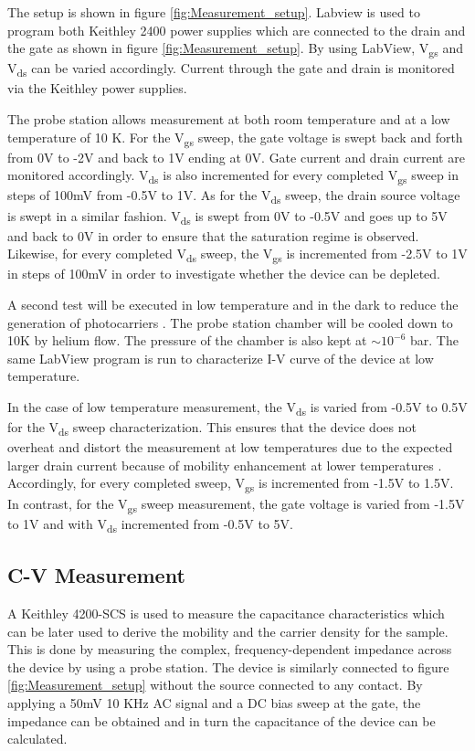\documentclass[11pt,a4paper]{report}
\begin{document}
The setup is shown in figure \ref{fig:Measurement_setup}. Labview is used to program both Keithley 2400 power supplies which are connected to the drain and the gate as shown in figure \ref{fig:Measurement_setup}. By using LabView, V\textsubscript{gs} and V\textsubscript{ds} can be varied accordingly. Current through the gate and drain is monitored via the Keithley power supplies.

The probe station allows measurement at both room temperature and at a low temperature of 10 K. For the V\textsubscript{gs} sweep, the gate voltage is swept back and forth from 0V to -2V and back to 1V ending at 0V. Gate current and drain current are monitored accordingly. V\textsubscript{ds} is also incremented for every completed V\textsubscript{gs} sweep in steps of 100mV from -0.5V to 1V. As for the V\textsubscript{ds} sweep, the drain source voltage is swept in a similar fashion. V\textsubscript{ds} is swept from 0V to -0.5V and goes up to 5V and back to 0V in order to ensure that the saturation regime is observed. Likewise, for every completed V\textsubscript{ds} sweep, the V\textsubscript{gs} is incremented from -2.5V to 1V in steps of 100mV in order to investigate whether the device can be depleted.

A second test will be executed in low temperature and in the dark to reduce the generation of photocarriers \cite{hook_hall_2013}. The probe station chamber will be cooled down to 10K by helium flow. The pressure of the chamber is also kept at $\sim 10^{-6}$ bar. The same LabView program is run to characterize I-V curve of the device at low temperature.

In the case of low temperature measurement, the V\textsubscript{ds} is varied from -0.5V to 0.5V for the V\textsubscript{ds} sweep characterization. This ensures that the device does not overheat and distort the measurement at low temperatures due to the expected larger drain current because of mobility enhancement at lower temperatures \cite{caviglia}. Accordingly, for every completed sweep, V\textsubscript{gs} is incremented from -1.5V to 1.5V. In contrast, for the V\textsubscript{gs} sweep measurement, the gate voltage is varied from -1.5V to 1V and with V\textsubscript{ds} incremented from -0.5V to 5V. 

\subsection{C-V Measurement}\label{Sec:CV}
A Keithley 4200-SCS is used to measure the capacitance characteristics which can be later used to derive the mobility and the carrier density for the sample. This is done by measuring the complex, frequency-dependent impedance across the device by using a probe station. The device is similarly connected to figure \ref{fig:Measurement_setup} without the source connected to any contact. By applying a 50mV 10 KHz AC signal and a DC bias sweep at the gate, the impedance can be obtained and in turn the capacitance of the device can be calculated.
\end{document}
